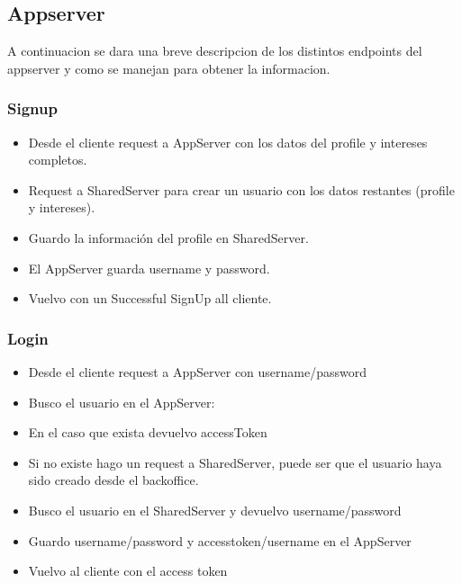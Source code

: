 \documentclass[letterpaper,10pt,english]{sphinxmanual}
\begin{document}
\subsection{Appserver}
\label{manuals:appserver}
A continuacion se dara una breve descripcion de los distintos endpoints del appserver y como se manejan para obtener la informacion.


\subsubsection{Signup}
\label{manuals:signup}\begin{itemize}
\item {} 
Desde el cliente request a AppServer con los datos del profile y intereses completos.

\item {} 
Request a SharedServer para crear un usuario con los datos restantes (profile y intereses).

\item {} 
Guardo la información del profile en SharedServer.

\item {} 
El AppServer guarda username y password.

\item {} 
Vuelvo con un Successful SignUp all cliente.

\end{itemize}


\subsubsection{Login}
\label{manuals:login}\begin{itemize}
\item {} 
Desde el cliente request a AppServer con username/password

\item {} 
Busco el usuario en el AppServer:

\item {} 
En el caso que exista devuelvo accessToken

\item {} 
Si no existe hago un request a SharedServer, puede ser que el usuario haya sido creado desde el backoffice.

\item {} 
Busco el usuario en el SharedServer y devuelvo username/password

\item {} 
Guardo username/password y accesstoken/username en el AppServer

\item {} 
Vuelvo al cliente con el access token

\end{itemize}
\end{document}
